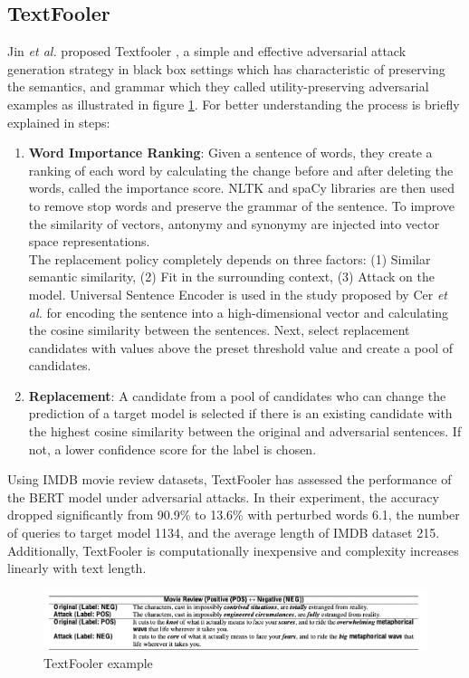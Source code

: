 \documentclass[%
	BCOR=8mm, %
	DIV=12,
	toc=bibliography, %
	toc=listof, %
	oneside, %
	egregdoesnotlikesansseriftitles, %
	]{scrbook}
\begin{document}
\subsection{TextFooler}
\label{subsection:textfooler}
Jin \textit{et al.} proposed Textfooler \cite{jia_certified_2019}, a simple and effective adversarial attack generation strategy in black box settings which has characteristic of preserving the semantics, and grammar which they called utility-preserving adversarial examples as illustrated in figure \ref{diag:TextFoolerExp}. For better understanding the process is briefly explained in steps:
\begin{enumerate}
    \item  \textbf{Word Importance Ranking}: Given a sentence of words, they create a ranking of each word by calculating the change before and after deleting the words, called the importance score. NLTK and spaCy libraries are then used to remove stop words and preserve the grammar of the sentence. To improve the similarity of vectors, antonymy and synonymy are injected into vector space representations.\\
    The replacement policy completely depends on three factors: (1) Similar semantic similarity, (2) Fit in the surrounding context, (3) Attack on the model. Universal Sentence Encoder is used in the study proposed by Cer \textit{et al.} \cite{cer_universal_2018} for encoding the sentence into a high-dimensional vector and calculating the cosine similarity between the sentences. Next, select replacement candidates with values above the preset threshold value and create a pool of candidates.
    \item \textbf{Replacement}: A candidate from a pool of candidates who can change the prediction of a target model is selected if there is an existing candidate with the highest cosine similarity between the original and adversarial sentences. If not, a lower confidence score for the label is chosen.
\end{enumerate}
Using IMDB movie review datasets, TextFooler has assessed the performance of the BERT model under adversarial attacks. In their experiment, the accuracy dropped significantly from 90.9\% to 13.6\% with perturbed words 6.1, the number of queries to target model 1134, and the average length of IMDB dataset 215. Additionally, TextFooler is computationally inexpensive and complexity increases linearly with text length. 
\begin{figure}[H]
    \centering
    \includegraphics[width=1.0\textwidth]{img/textfooler_example.png}
    \caption[Example of TextFooler]{TextFooler example  \cite{jia_certified_2019} }
    \label{diag:TextFoolerExp}
\end{figure}
\end{document}
